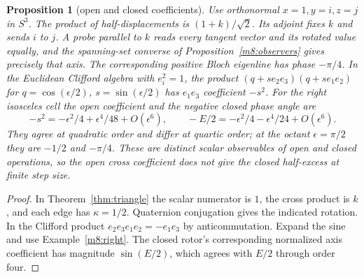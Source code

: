 \documentclass[11pt,reqno]{amsart}
\newtheorem{proposition}[theorem]{Proposition}
\theoremstyle{definition}
\theoremstyle{remark}
\numberwithin{equation}{section}
\begin{document}
\begin{proposition}[open and closed coefficients]\label{m8:octant}
Use orthonormal $x=1,y=i,z=j$ in $S^3$. The product of half-displacements
is $(1+k)/\sqrt2$. Its adjoint fixes $k$ and sends $i$ to $j$. A probe
parallel to $k$ reads every tangent vector and its rotated value
equally, and the spanning-set converse of Proposition~\ref{m8:observers}
gives precisely that axis. The corresponding positive Bloch eigenline
has phase $-\pi/4$.
In the Euclidean Clifford algebra with $e_i^2=1$, the product
$(q+s e_2e_3)(q+s e_1e_2)$ for $q=\cos(\epsilon/2)$,
$s=\sin(\epsilon/2)$ has $e_1e_3$ coefficient $-s^2$.
For the right isosceles cell the open coefficient and the negative
closed phase angle are
\[
 -s^2=-\epsilon^2/4+\epsilon^4/48+O(\epsilon^6),\qquad
 -E/2=-\epsilon^2/4-\epsilon^4/24+O(\epsilon^6).
\]
They agree at quadratic order and differ at quartic order; at the octant $\epsilon=\pi/2$ they are $-1/2$ and $-\pi/4$.  These are
distinct scalar observables of open and closed operations, so the open cross coefficient does not give the closed half-excess at
finite step size.
\end{proposition}
\begin{proof}
In Theorem~\ref{thm:triangle} the scalar numerator is $1$, the cross
product is $k$, and each edge has $\kappa=1/2$. Quaternion conjugation
gives the indicated rotation. In the Clifford product
$e_2e_3e_1e_2=-e_1e_3$ by anticommutation. Expand the sine and use
Example~\ref{m8:right}. The closed rotor's corresponding normalized
axis coefficient has magnitude $\sin(E/2)$, which agrees with $E/2$
through order four.
\end{proof}
\end{document}
